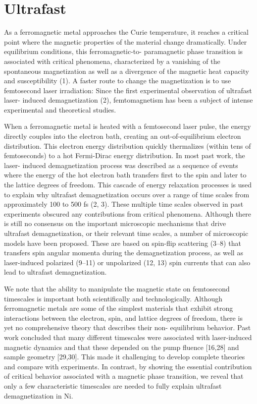 \section{Ultrafast}
As a ferromagnetic metal approaches the Curie temperature, it reaches a critical point where the magnetic properties of the material change dramatically. Under equilibrium conditions, this ferromagnetic-to- paramagnetic phase transition is associated with critical phenomena, characterized by a vanishing of the spontaneous magnetization as well as a divergence of the magnetic heat capacity and susceptibility (1). A faster route to change the magnetization is to use femtosecond laser irradiation: Since the first experimental observation of ultrafast laser- induced demagnetization (2), femtomagnetism has been a subject of intense experimental and theoretical studies.

When a ferromagnetic metal is heated with a femtosecond laser pulse, the energy directly couples into the electron bath, creating an out-of-equilibrium electron distribution. This electron energy distribution quickly thermalizes (within tens of femtoseconds) to a hot Fermi-Dirac energy distribution. In most past work, the laser- induced demagnetization process was described as a sequence of events where the energy of the hot electron bath transfers first to the spin and later to the lattice degrees of freedom. This cascade of energy relaxation processes is used to explain why ultrafast demagnetization occurs over a range of time scales from approximately 100 to 500 fs (2, 3). These multiple time scales observed in past experiments obscured any contributions from critical phenomena. Although there is still no consensus on the important microscopic mechanisms that drive ultrafast demagnetization, or their relevant time scales, a number of microscopic models have been proposed. These are based on spin-flip scattering (3–8) that transfers spin angular momenta during the demagnetization process, as well as laser-induced polarized (9–11) or unpolarized (12, 13) spin currents that can also lead to ultrafast demagnetization.

We note that the ability to manipulate the magnetic state on femtosecond timescales is important both scientifically and technologically. Although ferromagnetic metals are some of the simplest materials that exhibit strong interactions between the electron, spin, and lattice degrees of freedom, there is yet no comprehensive theory that describes their non- equilibrium behavior. Past work concluded that many different timescales were associated with laser-induced magnetic dynamics and that these depended on the pump fluence [16,28] and sample geometry [29,30]. This made it challenging to develop complete theories and compare with experiments. In contrast, by showing the essential contribution of critical behavior associated with a magnetic phase transition, we reveal that only a few characteristic timescales are needed to fully explain ultrafast demagnetization in Ni.



